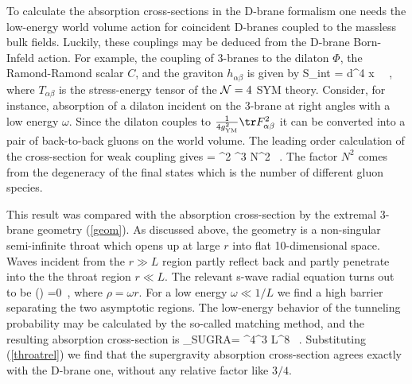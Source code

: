 To calculate the absorption cross-sections in the D-brane formalism one
needs the low-energy world volume action for coincident D-branes coupled to
the massless bulk fields. Luckily, these couplings may be deduced
from the D-brane Born-Infeld action. For example, the coupling
of 3-branes to the dilaton $\Phi$, the Ramond-Ramond scalar $C$,
and the graviton $h_{\alpha\beta}$ is given by \cite{kleb,gukt}
\be \label{sint}
   S_{\rm int} = {\sqrt \pi\over\kappa}
\int d^4 x \,  \ ,
 \ee
 where $T_{\alpha\beta}$ is
the stress-energy tensor of the ${\cal N}=4$ SYM theory.
Consider, for instance, absorption of a dilaton incident on the 3-brane
at right angles with a low energy
$\omega$. Since the dilaton couples to 
${1\over 4 g_{\rm YM}^2}\tr F_{\alpha\beta}^2$
it can be converted into a pair of back-to-back gluons on the world volume.
The leading order calculation of the cross-section
for weak coupling gives \cite{kleb}
\be\label{absorb}
   \sigma = {\kappa^2  \omega^3 N^2 \pi} \ .
 \ee
The factor $N^2$ comes from the degeneracy of
the final states which is the number of different gluon species.

This result was compared with the absorption cross-section by
the extremal 3-brane geometry (\ref{geom}).
As discussed above, the geometry
is a non-singular semi-infinite throat which opens up at large
$r$ into flat 10-dimensional space. 
Waves incident from the $r \gg L$ region partly reflect back and
partly penetrate into the the throat region $r \ll L$.
The relevant s-wave radial equation turns out to be \cite{kleb}
\be
\label{Coulthree}
 \psi(\rho) =0\ ,
\ee
where $\rho = \omega r$. For a low energy $\omega \ll 1/L$ we find
a high barrier separating the two asymptotic regions.
The low-energy behavior of the tunneling probability may be calculated
by the so-called matching method, and the resulting absorption
cross-section is \cite{kleb}
\be
\label{three}
\sigma_{SUGRA}= {\pi^4}\omega^3 L^8 \ .
\ee
Substituting (\ref{throatrel}) we find that the supergravity
absorption cross-section agrees exactly with the D-brane one,
without any relative factor like $3/4$.

